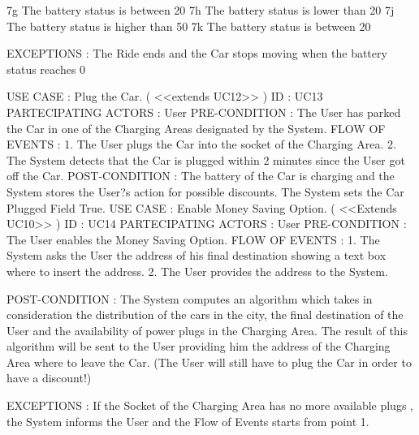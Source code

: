 7g The battery status is between 20%
7h The battery status is lower than 20%
7j The battery status is higher than 50%
7k The battery status is between 20%

EXCEPTIONS : 
The Ride ends and the Car stops moving when the battery status reaches 0%

USE CASE : Plug the Car.  ( <<extends UC12>> )
ID : UC13
PARTECIPATING ACTORS : User 
PRE-CONDITION : The User has parked the Car in one of the Charging Areas designated by the System. 
FLOW OF EVENTS :
1. The User plugs the Car into the socket of the Charging Area. 
2. The System detects that the Car is plugged within 2 minutes since the User got off the Car.
POST-CONDITION :  
The battery of the Car is charging and the System stores the User?s action for possible discounts.
The System sets the Car Plugged Field True.
USE CASE : Enable Money Saving Option. ( <<Extends UC10>> )
ID : UC14
PARTECIPATING ACTORS : User 
PRE-CONDITION : The User enables the Money Saving Option.
FLOW OF EVENTS : 
1. The System asks the User the address of his final destination showing a text box where to insert the address.
2. The User provides the address to the System.

POST-CONDITION :  
The System computes an algorithm which takes in consideration the distribution of the cars in the city, the final destination of the User and the availability of power plugs in the Charging Area. The result of this algorithm will be sent to the User providing him the address of the Charging Area where to leave the Car. 
(The User will still have to plug the Car in order to have a discount!)

EXCEPTIONS : 
If the Socket of the Charging Area has no more available plugs , the System informs the User and the Flow of Events starts from point 1.